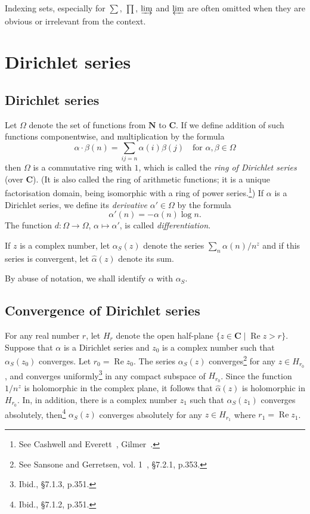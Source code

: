 \documentclass[10pt]{article}
\theoremstyle{definition}
\def\NN{\mathbf{N}}
\def\CC{\mathbf{C}}
\DeclareMathOperator{\re}{Re}
\def\fnon{See Cashwell and Everett~\cite{bib:31}, Gilmer~\cite{bib:63}.}
\def\fntw{See Sansone and Gerretsen, vol. 1~\cite{bib:162}, \S7.2.1, p.353.}
\def\fnth{Ibid., \S7.1.3, p.351.}
\def\fnfo{Ibid., \S7.1.2, p.351.}
\begin{document}
Indexing sets, especially for $\sum$, $\prod$, $\varinjlim$ and $\varprojlim$ are often omitted when they are obvious or irrelevant from the context.



\section{Dirichlet series}
\label{ch:1}

\subsection{Dirichlet series}
\label{ch:1.1}

Let $\Omega$ denote the set of functions from $\NN$ to $\CC$.
If we define addition of such functions componentwise, and multiplication by the formula
\[
\alpha \cdot \beta(n)
= \sum_{ij=n} \alpha(i) \beta(j)
\quad
\text{for $\alpha,\beta \in \Omega$}
\]
then $\Omega$ is a commutative ring with $1$, which is called the \emph{ring of Dirichlet series} (over $\CC$).
(It is also called the ring of arithmetic functions; it is a unique factorisation domain, being isomorphic with a ring of power series.\footnote{\fnon})
If $\alpha$ is a Dirichlet series, we define its \emph{derivative} $\alpha' \in \Omega$ by the formula
\[
\alpha'(n) = -\alpha(n) \log n.
\]
The function $d : \Omega \to \Omega$, $\alpha \mapsto \alpha'$, is called \emph{differentiation}.

If $z$ is a complex number, let $\alpha_S(z)$ denote the series $\sum_n \alpha(n) / n^z$ and if this series is convergent, let $\widehat \alpha(z)$ denote its sum.

By abuse of notation, we shall identify $\alpha$ with $\alpha_S$.


\subsection{Convergence of Dirichlet series}
\label{ch:1.2}

For any real number $r$, let $H_r$ denote the open half-plane $\{ z \in \CC \mid \re z > r \}$.
Suppose that $\alpha$ is a Dirichlet series and $z_0$ is a complex number such that $\alpha_S(z_0)$ converges.
Let $r_0 = \re z_0$.
The series $\alpha_S(z)$ converges\footnote{\fntw} for any $z \in H_{r_0}$, and converges uniformly\footnote{\fnth} in any compact subspace of $H_{r_0}$.
Since the function $1/n^z$ is holomorphic in the complex plane, it follows that $\widehat\alpha(z)$ is holomorphic in $H_{r_0}$.
In, in addition, there is a complex number $z_1$ such that $\alpha_S(z_1)$ converges absolutely, then\footnote{\fnfo} $\alpha_S(z)$ converges absolutely for any $z \in H_{r_1}$ where $r_1 = \re z_1$.
\end{document}
